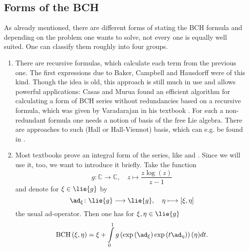 \subsection{Forms of the BCH}
As already mentioned, there are different forms of stating the BCH formula 
and depending on the problem one wants to solve, not every one is equally 
well suited. One can classify them roughly into four groups.
\begin{enumerate}
	\item
	There are recursive formulas, which calculate each term from the 
	previous one. The first expressions due to Baker, Campbell and Hausdorff 
	were of this kind. Though the idea is old, this approach is still much in
	use and allows powerful applications: Casas and Murua found an 
	efficient algorithm \cite{casas.murua:2009a} for calculating 	a form of 
	BCH series without redundancies based on a recursive formula, which was 
	given by Varadarajan in his textbook \cite{varadarajan:1974a}. 
	For such a non-redundant formula one needs a notion of basis of the free 
	Lie algebra. There are approaches to such (Hall or Hall-Viennot) basis, 
	which can e.g. be found in \cite{serre:2006a}.
	
	\item
	Most textbooks prove an integral form of the series, like 
	\cite{hall:2003a} and \cite{hilgert.neeb:2012a}. Since we will use it, 
	too, we want to introduce it briefly. Take the function
	\begin{equation}
		\label{Alg:DefinitionLogBernoullis}
		g \colon 
		\mathbb{C}
		\longrightarrow
		\mathbb{C},
		\quad
		z 
		\longmapsto
		\frac{ z \log(z) }{z - 1}
	\end{equation}
	and denote for $\xi \in \lie{g}$ by
	\begin{equation*}
		\ad_{\xi}
		\colon
		\lie{g}
		\longrightarrow
		\lie{g},
		\quad
		\eta
		\longmapsto
		[\xi, \eta]
	\end{equation*}
	the usual ad-operator. Then one has for $\xi, \eta \in \lie{g}$
	\begin{equation}
		\label{Alg:BCHinIntegral}
		\bch{\xi}{\eta}
		=
		\xi + 
		\int\limits_0^1
		g \left( 
			\exp \left(
				\ad_{\xi}
			\right)
			\exp \left(
				t \ad_{\eta}
			\right)
		\right)
		(\eta) 
		dt.
	\end{equation}
	

\end{enumerate}
